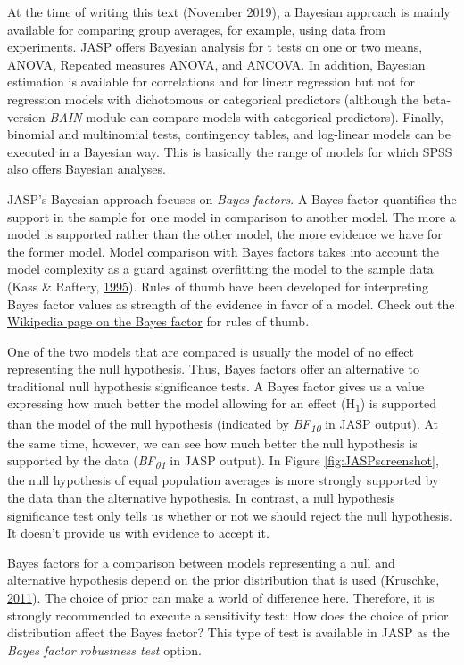 \documentclass[doc]{apa6}
\begin{document}
At the time of writing this text (November 2019), a Bayesian approach is
mainly available for comparing group averages, for example, using data
from experiments. JASP offers Bayesian analysis for t tests on one or
two means, ANOVA, Repeated measures ANOVA, and ANCOVA. In addition,
Bayesian estimation is available for correlations and for linear
regression but not for regression models with dichotomous or categorical
predictors (although the beta-version \emph{BAIN} module can compare
models with categorical predictors). Finally, binomial and multinomial
tests, contingency tables, and log-linear models can be executed in a
Bayesian way. This is basically the range of models for which SPSS also
offers Bayesian analyses.

JASP's Bayesian approach focuses on \emph{Bayes factors}. A Bayes factor
quantifies the support in the sample for one model in comparison to
another model. The more a model is supported rather than the other
model, the more evidence we have for the former model. Model comparison
with Bayes factors takes into account the model complexity as a guard
against overfitting the model to the sample data (Kass \& Raftery,
\protect\hyperlink{ref-kassBayesFactors1995}{1995}). Rules of thumb have
been developed for interpreting Bayes factor values as strength of the
evidence in favor of a model. Check out the
\href{https://en.wikipedia.org/wiki/Bayes_factor\#Interpretation}{Wikipedia
page on the Bayes factor} for rules of thumb.

One of the two models that are compared is usually the model of no
effect representing the null hypothesis. Thus, Bayes factors offer an
alternative to traditional null hypothesis significance tests. A Bayes
factor gives us a value expressing how much better the model allowing
for an effect (H\textsubscript{1}) is supported than the model of the
null hypothesis (indicated by \emph{BF\textsubscript{10}} in JASP
output). At the same time, however, we can see how much better the null
hypothesis is supported by the data (\emph{BF\textsubscript{01}} in JASP
output). In Figure \ref{fig:JASPscreenshot}, the null hypothesis of
equal population averages is more strongly supported by the data than
the alternative hypothesis. In contrast, a null hypothesis significance
test only tells us whether or not we should reject the null hypothesis.
It doesn't provide us with evidence to accept it.

Bayes factors for a comparison between models representing a null and
alternative hypothesis depend on the prior distribution that is used
(Kruschke,
\protect\hyperlink{ref-kruschkeBayesianAssessmentNull2011}{2011}). The
choice of prior can make a world of difference here. Therefore, it is
strongly recommended to execute a sensitivity test: How does the choice
of prior distribution affect the Bayes factor? This type of test is
available in JASP as the \emph{Bayes factor robustness test} option.
\end{document}
